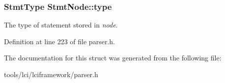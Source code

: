 \hypertarget{struct_stmt_node_a1a1a8ff13773a99c9344f5392cabfa13}{
\subsubsection[{type}]{\setlength{\rightskip}{0pt plus 5cm}Stmt\-Type {\bf Stmt\-Node\-::type}}}\label{struct_stmt_node_a1a1a8ff13773a99c9344f5392cabfa13}
The type of statement stored in {\itshape node\/}. 

Definition at line 223 of file parser.\-h.



The documentation for this struct was generated from the following file\-:\begin{DoxyCompactItemize}
\item 
tools/lci/lciframework/parser.\-h\end{DoxyCompactItemize}
